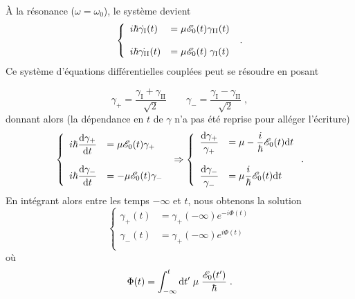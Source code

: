 \documentclass[../notesdecours.tex]{subfiles}
\begin{document}
À la résonance ($\omega = \omega_0$), le système devient
$$\left\{
    \begin{array}{ll}
        i\hbar\dot{\gamma_\mathrm{I}}(t) &= \mu \mathcal{E}_0(t) \gamma_\mathrm{II}(t) \\
        \strut \\
        i\hbar \dot{\gamma_\mathrm{II}}(t) &= \mu \mathcal{E}_0(t)\; \gamma_\mathrm{I}(t) 
    \end{array}
\right. \; .$$
Ce système d'équations différentielles couplées peut se résoudre en posant 

$$\gamma_+ = \dfrac{\gamma_\mathrm{I} + \gamma_\mathrm{II}}{\sqrt{2}} \qquad \gamma_- = \dfrac{\gamma_\mathrm{I} - \gamma_\mathrm{II}}{\sqrt{2}}\;,$$
donnant alors (la dépendance en $t$ de $\gamma$ n'a pas été reprise pour alléger l'écriture)
$$\left\{
    \begin{array}{ll}
        i\hbar\dfrac{\mathrm{d}\gamma_+}{\mathrm{d}t} &= \mu \mathcal{E}_0(t) \gamma_+ \\
        \strut \\
        i\hbar\dfrac{\mathrm{d}\gamma_-}{\mathrm{d}t} &= -\mu \mathcal{E}_0(t) \gamma_- \\
    \end{array}
\right. \; \Rightarrow \left\{
    \begin{array}{ll}
        \dfrac{\mathrm{d}\gamma_+}{\gamma_+} &= \mu -\dfrac{i}{\hbar}\mathcal{E}_0(t) \mathrm{d}t \\
        \strut \\
        \dfrac{\mathrm{d}\gamma_-}{\gamma_-} &= \mu \dfrac{i}{\hbar}\mathcal{E}_0(t) \mathrm{d}t \\
    \end{array}
\right. .$$
En intégrant alors entre les temps $-\infty$ et $t$, nous obtenons la solution 
$$\left\{ 
    \begin{array}{ll}
        \gamma_+(t) &= \gamma_+(-\infty) e^{-i\Phi(t)} \\
        \gamma_-(t) &= \gamma_+(-\infty) e^{i\Phi(t)} \\
        \end{array}
\right.$$
où 
\begin{equation}\label{eq:chap5-rabi-phi}
    \Phi(t) = \int_{-\infty}^t \mathrm{d}t'\; \mu\;  \dfrac{\mathcal{E}_0(t')}{\hbar}\; .
\end{equation}
\end{document}
